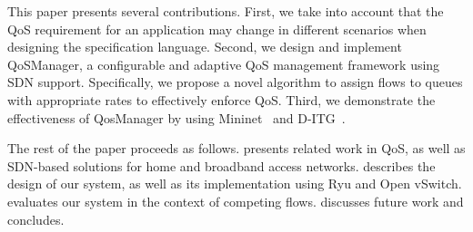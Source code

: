 This paper presents several contributions. First, we take into account that the QoS requirement for an application
may change in different scenarios when designing the specification language. Second, we design and implement
QoSManager, a configurable and adaptive QoS management framework using SDN support. Specifically, we propose a novel
algorithm to assign flows to queues with appropriate rates to effectively enforce QoS. Third, we demonstrate the
effectiveness of QosManager by using Mininet~\cite{mininet} and D-ITG~\cite{d-itg}.

The rest of the paper proceeds as follows. 
 presents related work in QoS, as well as SDN-based solutions
for home and broadband access networks. 
 describes the design of our system, as well as its implementation using Ryu and Open vSwitch.
 evaluates
our system in the
context of competing flows.  discusses future work
and concludes.
